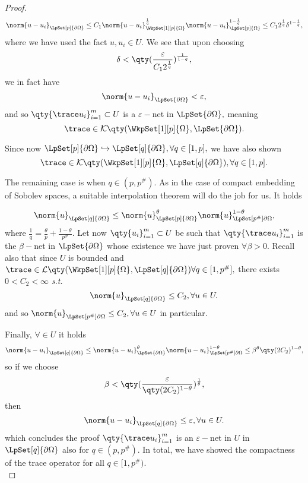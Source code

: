 \begin{proof}
\[
	\norm{u-u_i}_{\LpSet[p]{\partial \Omega}} \leq C_1 \norm{u-u_i}_{\WkpSet[1][p]{\Omega}}^{\frac{1}{q}}\norm{u-u_i}_{\LpSet[p]{\Omega}}^{1- \frac{1}{q}}\leq C_1 2^{\frac{1}{q}} \delta^{1-\frac{1}{q}},
\]
where we have used the fact $u, u_i \in U.$ We see that upon choosing
\[
	\delta < \qty(\frac{\varepsilon}{C_1 2^{\frac{1}{q}}})^{\frac{1}{1-q}},
\]
we in fact have
\[
	\norm{u-u_i}_{\LpSet{\partial \Omega}} < \varepsilon,
\]
and so $\qty{\trace u_i}_{i=1}^m \subset U$ is a $\varepsilon-$net in $\LpSet{\partial \Omega},$ meaning
\[
	\trace \in \mathcal{K}\qty(\WkpSet[1][p]{\Omega}, \LpSet{\partial \Omega}).
\]

Since now $\LpSet[p]{\partial \Omega} \hookrightarrow \LpSet[q]{\partial \Omega}, \forall q \in [1,p],$ we have also shown
\[
	\trace \in \mathcal{K}\qty(\WkpSet[1][p]{\Omega}, \LpSet[q]{\partial \Omega}), \forall q \in [1,p].
\]

The remaining case is when $q \in (p, p^{\#}).$ As in the case of compact embedding of Sobolev spaces, a suitable interpolation theorem will do the job for us. It holds

\[
	\norm{u}_{\LpSet[q]{\partial \Omega}}\leq \norm{u}_{\LpSet[p]{\partial \Omega}}^{\theta} \norm{u}_{\LpSet[p^{\#}]{\partial \Omega}}^{1-\theta},
\]
where $\frac{1}{q} = \frac{\theta}{p} + \frac{1-\theta}{p^{\#}}.$ Let now $\qty{u_i}_{i=1}^m \subset U$ be such that $\qty{\trace u_i}_{i=1}^m$ is the $\beta-$net in $\LpSet{\partial \Omega}$ whose existence we have just proven $\forall \beta >0.$ Recall also that since $U$ is bounded and $\trace \in \mathcal{L}\qty(\WkpSet[1][p]{\Omega}, \LpSet[q]{\partial \Omega}) \forall q \in [1,p^{\#}],$ there exists $0< C_2 < \infty$ \textit{s.t.}
\[
	\norm{u}_{\LpSet[q]{\partial \Omega}} \leq C_2, \forall u \in U.
\]
and so $\norm{u}_{\LpSet[p^{\#}]{\partial \Omega}} \leq C_2, \forall u \in U$ in particular.

Finally, $\forall \in U$ it holds
\[
	\norm{u-u_i}_{\LpSet[q]{\partial \Omega}} \leq \norm{u-u_i}_{\LpSet{\partial \Omega}}^{\theta}\norm{u-u_i}_{\LpSet[p^{\#}]{\partial \Omega}}^{1-\theta} \leq \beta^{\theta}\qty(2C_2)^{1-\theta},
\]
so if we choose
\[
	\beta <\qty(\frac{\varepsilon}{\qty(2C_2)^{1-\theta}})^{\frac{1}{\theta}},
\]
then
\[
	\norm{u-u_i}_{\LpSet[q]{\partial \Omega}} \leq \varepsilon, \forall u \in U.
\]
which concludes the proof $\qty{\trace u_i}_{i=1}^m$ is an $\varepsilon-$net in $U$ in $\LpSet[q]{\partial \Omega}$ also for $q \in (p,p^{\#})$. In total, we have showed the compactness of the trace operator for all $q \in [1, p^{\#}).$\\


\end{proof}
